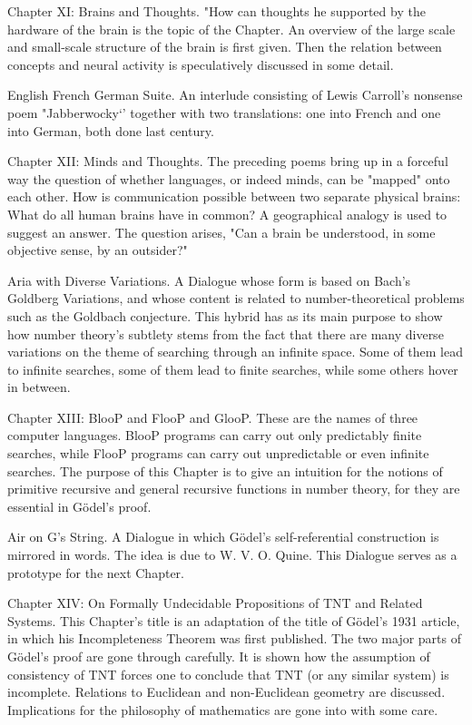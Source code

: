 Chapter XI: Brains and Thoughts. "How can thoughts he supported by the hardware of the brain is
  the topic of the Chapter. An overview of the large scale and small-scale structure of the brain is
  first given. Then the relation between concepts and neural activity is speculatively discussed in
  some detail.

English French German Suite. An interlude consisting of Lewis Carroll's nonsense poem
  "Jabberwocky`' together with two translations: one into French and one into German, both done
  last century.

Chapter XII: Minds and Thoughts. The preceding poems bring up in a forceful way the question
  of whether languages, or indeed minds, can be "mapped" onto each other. How is communication
  possible between two separate physical brains: What do all human brains have in common? A
  geographical analogy is used to suggest an answer. The question arises, "Can a brain be
  understood, in some objective sense, by an outsider?"

Aria with Diverse Variations. A Dialogue whose form is based on Bach's Goldberg Variations, and
   whose content is related to number-theoretical problems such as the Goldbach conjecture. This
   hybrid has as its main purpose to show how number theory's subtlety stems from the fact that
   there are many diverse variations on the theme of searching through an infinite space. Some of
   them lead to infinite searches, some of them lead to finite searches, while some others hover in
   between.

Chapter XIII: BlooP and FlooP and GlooP. These are the names of three computer languages.
  BlooP programs can carry out only predictably finite searches, while FlooP programs can carry
  out unpredictable or even infinite searches. The purpose of this Chapter is to give an intuition for
  the notions of primitive recursive and general recursive functions in number theory, for they are
  essential in Gödel’s proof.

Air on G's String. A Dialogue in which Gödel’s self-referential construction is mirrored in words.
   The idea is due to W. V. O. Quine. This Dialogue serves as a prototype for the next Chapter.

Chapter XIV: On Formally Undecidable Propositions of TNT and Related Systems. This
  Chapter's title is an adaptation of the title of Gödel’s 1931 article, in which his Incompleteness
  Theorem was first published. The two major parts of Gödel’s proof are gone through carefully. It
  is shown how the assumption of consistency of TNT forces one to conclude that TNT (or any
  similar system) is incomplete. Relations to Euclidean and non-Euclidean geometry are discussed.
  Implications for the philosophy of mathematics are gone into with some care.





